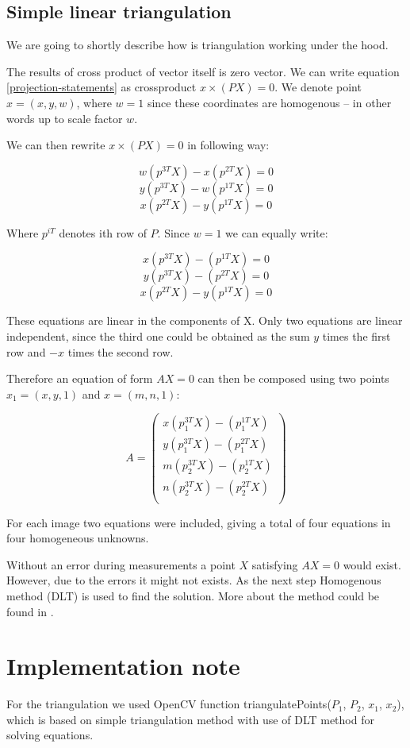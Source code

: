 \subsection{Simple linear triangulation}
We are going to shortly describe how is triangulation working under the hood.

The results of cross product of vector itself is zero vector. We can write
equation \ref{projection-statements} as crossproduct $x \times (PX) = 0$. We
denote point $x = (x, y, w)$, where $w = 1$ since these coordinates are
homogenous -- in other words up to scale factor $w$.

We can then rewrite $x \times (PX) = 0$ in following way:

$$ w(p^{3T}X) - x(p^{2T}X) = 0 $$
$$ y(p^{3T}X) - w(p^{1T}X) = 0 $$
$$ x(p^{2T}X) - y(p^{1T}X) = 0 $$

Where $p^{iT}$ denotes ith row of $P$. Since $w = 1$ we can equally write:

$$ x(p^{3T}X) - (p^{1T}X) = 0 $$
$$ y(p^{3T}X) - (p^{2T}X) = 0 $$
$$ x(p^{2T}X) - y(p^{1T}X) = 0 $$

These equations are linear in the components of X. Only two equations are
linear independent, since the third one could be obtained as the sum $y$
times the first row and $-x$ times the second row.

Therefore an equation of form $AX = 0$ can then be composed using two points $x_1 = (x, y, 1)$ and $x = (m, n, 1)$:

\[
A = \begin{pmatrix}
x(p_1^{3T}X) - (p_1^{1T}X) \\
y(p_1^{3T}X) - (p_1^{2T}X) \\
m(p_2^{3T}X) - (p_2^{1T}X) \\
n(p_2^{3T}X) - (p_2^{2T}X) \\
\end{pmatrix}
\]

For each image two equations were included, giving a total of four equations in
four homogeneous unknowns.

Without an error during measurements a point $X$ satisfying $AX = 0$ would
exist. However, due to the errors it might not exists. As the next step Homogenous
method (DLT) is used to find the solution. More about the method could be found
in \citet*{multiple-view-geometry}.

\section{Implementation note}
For the triangulation we used OpenCV function triangulatePoints($P_1$, $P_2$,
$x_1$, $x_2$), which is based on simple triangulation method with use of DLT
method for solving equations.
